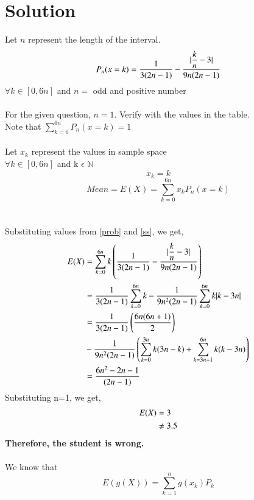 \documentclass[journal,12pt,twocolumn]{IEEEtran}
\begin{document}
\section*{Solution}
Let $n$ represent the length of the interval.\\
\begin{equation}\label{prob}
P_n(x=k) = \dfrac{1}{3(2n-1)} - \dfrac{\vert\dfrac{k}{n}-3\vert}{9n(2n-1)}
\end{equation}
$\forall k\in[0,6n]$ and $n=$ odd and positive number\\\\
For the given question, $n=1$. Verify with the values in the table.\\
Note that $\displaystyle\sum^{6n}_{k=0}P_n(x=k)=1$\\\\
Let $x_k$ represent the values in sample space \\$\forall k\in[0,6n]$
and k $\epsilon $ $\mathbb{N}$\\
\begin{equation}\label{ss}
x_k=k 
\end{equation}
\begin{equation}\label{mean}
Mean = E(X) = \sum^{6n}_{k=0}x_k P_n(x=k)
\end{equation}
\\\\
Substituting values from \ref{prob} and \ref{ss}, we get,
\begin{align}
E(X) &= \sum^{6n}_{k=0}k\left(\dfrac{1}{3(2n-1)} - \dfrac{\vert\dfrac{k}{n}-3\vert}{9n(2n-1)}\right)
     \\[\parskip]
     &= \dfrac{1}{3(2n-1)}\sum^{6n}_{k=0}k - \dfrac{1}{9n^2(2n-1)}\sum^{6n}_{k=0}k\vert k-3n\vert
    \\[\parskip]
    \nonumber&=\dfrac{1}{3(2n-1)}\left(\dfrac{6n(6n+1)}{2}\right)\\
    &- \dfrac{1}{9n^2(2n-1)}\left(\sum^{3n}_{k=0}k(3n-k)+  \sum^{6n}_{k=3n+1}k(k-3n)\right)
    \\[\parskip]
     &= \dfrac{6n^2-2n-1}{(2n-1)}
\end{align}
Substituting n=1, we get,
\begin{align}
E(X) &= 3
  \\[\parskip]
  &\neq 3.5
\end{align}
\textbf{Therefore, the student is  wrong.}\\\\
We know that
\begin{equation}
E(g(X)) = \sum^{n}_{k=1}g(x_k) P_k
\end{equation}
\end{document}
